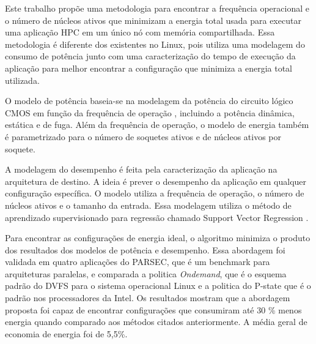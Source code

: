 Este trabalho propõe uma metodologia para encontrar a frequência operacional e o número de núcleos ativos que minimizam a energia total usada para executar uma aplicação HPC em um único nó com memória compartilhada. Essa metodologia é diferente dos existentes no Linux, pois utiliza uma modelagem do consumo de potência junto com uma caracterização do tempo de execução da aplicação para melhor encontrar a configuração que minimiza a energia total utilizada.

O modelo de potência baseia-se na modelagem da potência do circuito lógico CMOS em função da frequência de operação \cite{Sarwar1997}, incluindo a potência dinâmica, estática e de fuga. Além da frequência de operação, o modelo de energia também é parametrizado para o número de soquetes ativos e de núcleos ativos por soquete.

A modelagem do desempenho é feita pela caracterização da aplicação na arquitetura de destino. A ideia é prever o desempenho da aplicação em qualquer configuração específica. O modelo utiliza a frequência de operação, o número de núcleos ativos e o tamanho da entrada. Essa modelagem utiliza o método de aprendizado supervisionado para regressão chamado Support Vector Regression  \cite{Ventura2009, Smola2004}.

Para encontrar as configurações de energia ideal, o algoritmo minimiza o produto dos resultados dos modelos de potência e desempenho. Essa abordagem foi validada em quatro aplicações do PARSEC, que é um benchmark para arquiteturas paralelas, \cite{Bienia2008} e comparada a politica \emph{Ondemand}, que é o esquema padrão do DVFS para o sistema operacional Linux e a politica do P-state que é o padrão nos processadores da Intel. Os resultados mostram que a abordagem proposta foi capaz de encontrar configurações que consumiram até 30 \% menos energia quando comparado aos métodos citados anteriormente. A média geral de economia de energia foi de 5,5\%.


